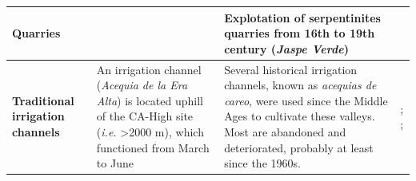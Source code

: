 \begin{table}
\begin{tabular}{
>{\centering\arraybackslash}p{}>{\raggedright\arraybackslash}p{}>{\raggedright\arraybackslash}p{}>{\raggedright\arraybackslash}p{}}
\textbf{Quarries} &  & Explotation of serpentinites quarries from 16th to 19th century (\textit{Jaspe Verde}) & \textcite{Navarro2014} \\ \midrule
\textbf{Traditional irrigation channels} & An irrigation channel (\textit{Acequia de la Era Alta}) is located uphill of the CA-High site (\textit{i.e.} \textgreater 2000 m), which functioned from March to June & Several historical irrigation channels, known as \textit{acequias de careo}, were used since the Middle Ages to cultivate these valleys. Most are abandoned and deteriorated, probably at least since the 1960s. & \textcite{MartinCivantos2014}; \textcite{MartinMontanes2015}; \textcite{RuizRuiz2017} \\
\bottomrule
\end{tabular}
\endgroup{} 
\end{table}


